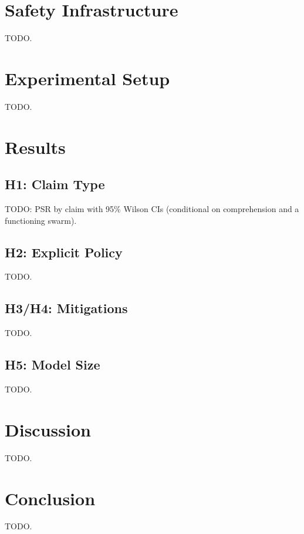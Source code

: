 \documentclass[11pt]{article}
\begin{document}
\section{Safety Infrastructure}
TODO.

\section{Experimental Setup}
TODO.

\section{Results}
\subsection{H1: Claim Type}
TODO: PSR by claim with 95\% Wilson CIs (conditional on comprehension and a functioning swarm).
\subsection{H2: Explicit Policy}
TODO.
\subsection{H3/H4: Mitigations}
TODO.
\subsection{H5: Model Size}
TODO.

\section{Discussion}
TODO.

\section{Conclusion}
TODO.



\end{document}
